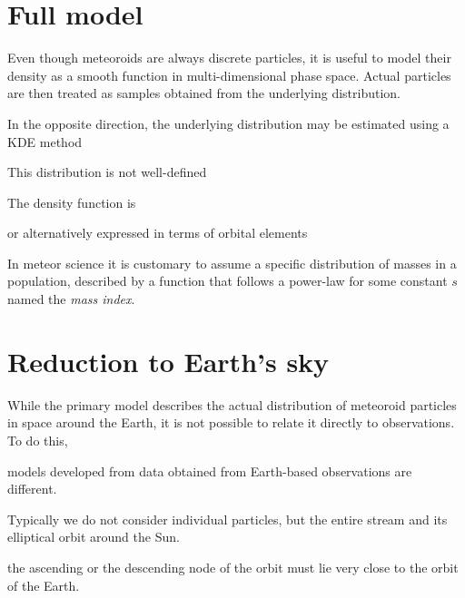 
\section{Full model} \label{pf}

    Even though meteoroids are always discrete particles, it is useful to model their density as a smooth
    function in multi-dimensional phase space.
    Actual particles are then treated as samples obtained from the underlying distribution.

    In the opposite direction, the underlying distribution may be estimated using a KDE method

    This distribution is not well-defined


    The density function is 
    \eqn{eq:pf-rv}{
        \varrho(\vec{r}, \vec{v}, t) \in \left[0, \infty\right).
    }

    or alternatively expressed in terms of orbital elements

    In meteor science it is customary to assume a specific distribution of masses in a population,
    described by a function that follows a power-law
    for some constant $s$ named the \emph{mass index}.


\section{Reduction to Earth's sky} \label{ir}
    While the primary model describes the actual distribution of meteoroid particles in space around the Earth,
    it is not possible to relate it directly to observations. To do this, 

    models developed from data obtained from Earth-based observations are different.

    Typically we do not consider individual particles, but the entire stream and its elliptical orbit around the Sun.

    the ascending or the descending node of the orbit must lie very close to the orbit of the Earth.




